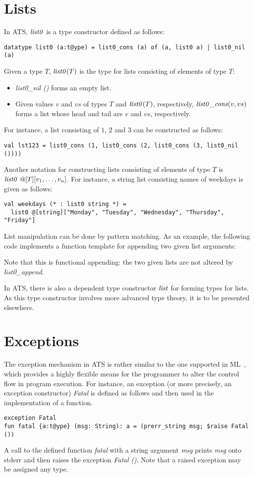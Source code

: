 \section{Lists}
In ATS, ${\it list0}$ is a type constructor defined as follows:
\begin{verbatim}
datatype list0 (a:t@ype) = list0_cons (a) of (a, list0 a) | list0_nil (a) 
\end{verbatim}
Given a type $T$, ${\it list0}(T)$ is the type for lists consisting of
elements of type $T$:
\begin{itemize}
\item {\it list0\_nil ()} forms an empty list.
\item Given values $v$ and $vs$ of types $T$ and ${\it list0}(T)$,
respectively, ${\it list0\_cons}(v, vs)$ forms a list whose head and tail
are $v$ and $vs$, respectively.
\end{itemize}
For instance, a list consisting of $1$, $2$ and $3$ can be constructed as
follows:
\begin{verbatim}
val lst123 = list0_cons (1, list0_cons (2, list0_cons (3, list0_nil ())))
\end{verbatim}
Another notation for constructing lists consisting of elements of type
$T$ is ${\it list0}~@[T][v_1,\ldots,v_n]$. For instance, a string list
consisting names of weekdays is given as follows:
\begin{verbatim}
val weekdays (* : list0 string *) =
  list0 @[string]["Monday", "Tuesday", "Wednesday", "Thursday", "Friday"]
\end{verbatim}
List manipulation can be done by pattern matching. As an example, the
following code implements a function template for appending two given list
arguments:

Note that this is functional appending: the two given lists are not altered
by {\it list0\_append}.

In ATS, there is also a dependent type constructor ${\it list}$ for forming
types for lists. As this type constructor involves more advanced type
theory, it is to be presented elsewhere.

\section{Exceptions}
The exception mechanism in ATS is rather similar to the one supported in
ML~\cite{SML97}, which provides a highly flexible means for the programmer
to alter the control flow in program execution. For instance,
an exception (or more precisely, an exception constructor) {\em
Fatal} is defined as follows and then used in the implementation of a
function.
\begin{verbatim}
exception Fatal
fun fatal {a:t@ype} (msg: String): a = (prerr_string msg; $raise Fatal ())
\end{verbatim}
A call to the defined function {\it fatal} with a string argument {\it msg}
prints {\it msg} onto stderr and then raises the exception {\it Fatal ()}.
Note that a raised exception may be assigned any type.

